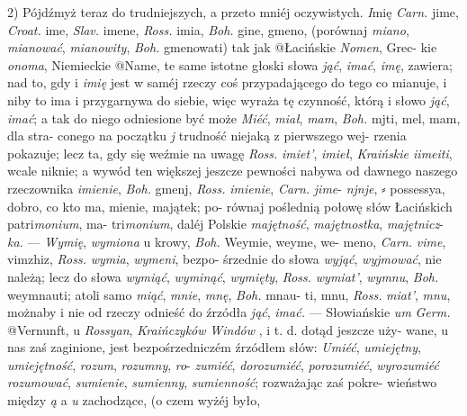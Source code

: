 
2) Pójdźmyż teraz do trudniejszych, a przeto mniéj
oczywistych. \textit{I}mię \textit{Carn.} jime, \textit{Croat.} ime, \textit{Slav.} imene,
\textit{Ross.} imia, \textit{Boh.} gine, gmeno, (porównaj \textit{miano}, \textit{mianować},
\textit{mianowity}, \textit{Boh.} gmenowati) tak jak @{Ł}acińskie \textit{Nomen}, Grec-
kie \textit{onoma}, Niemieckie @{Name}, te same istotne głoski słowa
\textit{jąć}, \textit{imać}, \textit{imę}, zawiera; nad to, gdy i \textit{imię} jest w saméj
rzeczy coś przypadającego do tego co mianuje, i niby to
ima i przygarnywa do siebie, więc wyraża tę czynność,
którą i słowo \textit{jąć}, \textit{imać}; a tak do niego odniesione być
może \textit{Miéć}, \textit{miał}, \textit{mam}, \textit{Boh.} mjti, mel, mam, dla stra-
conego na początku \textit{j} trudność niejaką z pierwszego wej-
rzenia pokazuje; lecz ta, gdy się weźmie na uwagę \textit{Ross.}
\textit{imiet'}, \textit{imieł}, \textit{Kraińskie iimeiti}, wcale niknie; a wywód ten
większej jeszcze pewności nabywa od dawnego naszego
rzeczownika \textit{imienie}, \textit{Boh.} gmenj, \textit{Ross.} \textit{imienie}, \textit{Carn.} \textit{jime}-
\textit{njnje},  ⸗ possessya, dobro, co kto ma, mienie, majątek; po-
równaj poślednią połowę słów Łacińskich patri\textit{monium}, ma-
tri\textit{monium}, daléj Polskie \textit{majętność}, \textit{majętnostka}, \textit{majętnicz}-
\textit{ka.} --- \textit{Wymię}, \textit{wymiona} u krowy, \textit{Boh.} Weymie, weyme, we-
meno, \textit{Carn.} \textit{vime}, vimzhiz, \textit{Ross.} \textit{wymia}, \textit{wymeni}, bezpo-
śrzednie do słowa \textit{wyjąć}, \textit{wyjmować}, nie należą; lecz do
słowa \textit{wymiąć}, \textit{wyminąć}, \textit{wymięty}, \textit{Ross.} \textit{wymiat'}, \textit{wymnu},
\textit{Boh.} weymnauti; atoli samo \textit{miąć}, \textit{mnie}, \textit{mnę}, \textit{Boh.} mnau-
ti, mnu, \textit{Ross.} \textit{miat'}, \textit{mnu}, możnaby i nie od rzeczy odnieść
do źrzódła \textit{jąć}, \textit{imać.} --- Słowiańskie \textit{um} \textit{Germ.} @{Vernunft},
u \textit{Rossyan}, \textit{Kraińczyków} \textit{Windów} , i t. d. dotąd jeszcze uży-
wane, u nas zaś zaginione, jest bezpośrzedniczém źrzódłem
słów: \textit{Umiéć}, \textit{umiejętny}, \textit{umiejętność}, \textit{rozum}, \textit{rozumny}, \textit{ro}-
\textit{zumiéć}, \textit{dorozumiéć}, \textit{porozumiéć}, \textit{wyrozumiéć} \textit{rozumować},
\textit{sumienie}, \textit{sumienny}, \textit{sumienność}; rozważając zaś pokre-
wieństwo między \textit{ą} a \textit{u} zachodzące, (o czem wyżéj było,

